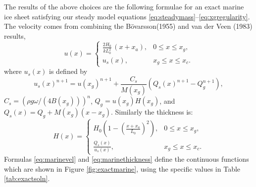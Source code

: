 \documentclass[twocolumn]{igs}
\renewcommand{\dh}{\fontencoding{T1}\selectfont{\symbol{240}}}
\newcommand{\bod}{B\"o\dh varsson\xspace}
\begin{document}
The results of the above choices are the following formulae for an exact marine ice sheet satisfying our steady model equations \eqref{eq:steadymass}--\eqref{eq:xgregularity}.  The velocity comes from combining the \bod (1955) and van der Veen (1983) results,
\begin{equation}
u(x) = \begin{cases} \frac{2 H_0}{k L_0^2}\,(x + x_a), & 0 \le x \le x_g, \\
                     u_s(x), & x_g \le x \le x_c.
       \end{cases} \label{eq:marinevel}
\end{equation}
where $u_s(x)$ is defined by
\begin{equation}
u_s(x)^{n+1} = u(x_g)^{n+1} + \frac{C_s}{M(x_g)} \left(Q_s(x)^{n+1} - Q_g^{n+1}\right), \label{eq:vanderveenvel}
\end{equation}
$C_s = \left(\rho g \omega/(4 B(x_g))\right)^n$, $Q_g = u(x_g) H(x_g)$, and $Q_s(x) = Q_g + M(x_g) (x-x_g)$.  Similarly the thickness is:
\begin{equation}
H(x) = \begin{cases} H_0 \left(1 - (\frac{x+x_a}{L_0})^2\right), & 0 \le x \le x_g, \\
                     \frac{Q_s(x)}{u_s(x)}, & x_g \le x \le x_c.
       \end{cases} \label{eq:marinethickness}
\end{equation}
Formulas \eqref{eq:marinevel} and \eqref{eq:marinethickness} define the continuous functions which are shown in Figure \ref{fig:exactmarine}, using the specific values in Table \ref{tab:exactsoln}.
\end{document}
